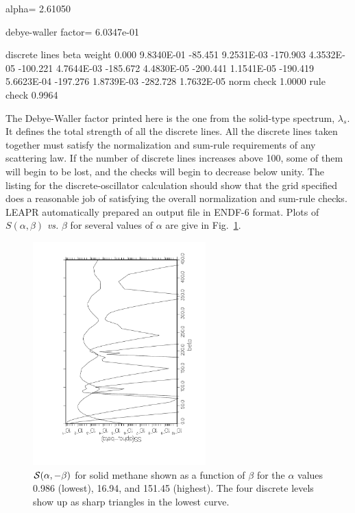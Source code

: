 \newpage
\small
\begin{ccode}

   alpha=   2.61050

      debye-waller factor=  6.0347e-01

      discrete lines
              beta      weight
             0.000  9.8340E-01
           -85.451  9.2531E-03
          -170.903  4.3532E-05
          -100.221  4.7644E-03
          -185.672  4.4830E-05
          -200.441  1.1541E-05
          -190.419  5.6623E-04
          -197.276  1.8739E-03
          -282.728  1.7632E-05
        norm check    1.0000
        rule check    0.9964

\end{ccode}
\normalsize

\noindent
The Debye-Waller factor printed here is the one from the solid-type
spectrum, $\lambda_s$.  It defines the total strength of all the
discrete lines.  All the discrete lines taken together must satisfy
the normalization and sum-rule requirements of any scattering law.
If the number of discrete lines increases above 100, some of them will
begin to be lost, and the checks will begin to decrease below unity.
The listing for the discrete-oscillator calculation should show that the
grid specified does a reasonable job of satisfying the overall
normalization and sum-rule checks.  LEAPR automatically prepared an
output file in ENDF-6 format.  Plots of $S(\alpha,\beta)$ {\it vs.}
$\beta$ for several values of $\alpha$ are give in Fig.~\ref{smeths}.

\begin{figure}[t]\centering
\includegraphics[keepaspectratio, height=3.4in, angle=270]{figs/le2ack}
\caption[${\cal S}(\alpha,-\beta)$ for solid methane]{${\cal S}(\alpha,-\beta)$
 for solid methane shown as a function of $\beta$ for the $\alpha$ values 0.986
 (lowest), 16.94, and 151.45 (highest).  The four discrete levels show up as
 sharp triangles in the lowest curve.}
\label{smeths}
\end{figure}

